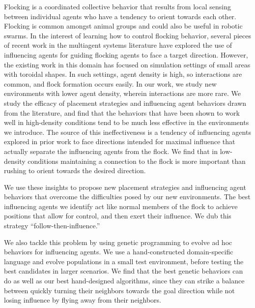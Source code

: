 
Flocking is a coordinated collective behavior that results from local sensing
between individual agents who have a tendency to orient towards each other.
Flocking is common amongst animal groups and could also be useful in robotic
swarms.
In the interest of learning how to control flocking behavior, several pieces
of recent work in the multiagent systems literature have explored the use of
influencing agents for guiding flocking agents to face a target direction.
However, the existing work in this domain has focused on simulation settings
of small areas with toroidal shapes.
In such settings, agent density is high, so interactions are common, and
flock formation occurs easily.
In our work, we study new environments with lower agent density, wherein
interactions are more rare.
We study the efficacy of placement strategies and influencing agent behaviors
drawn from the literature, and find that the behaviors that have been shown to
work well in high-density conditions tend to be much less effective in the
environments we introduce.
The source of this ineffectiveness is a tendency of influencing agents explored
in prior work to face directions intended for maximal influence that actually
separate the influencing agents from the flock.
We find that in low-density conditions maintaining a connection to the flock is
more important than rushing to orient towards the desired direction.

We use these insights to propose new placement strategies and influencing agent
behaviors that overcome the difficulties posed by our new environments.
The best influencing agents we identify act like normal members of the flock to
achieve positions that allow for control, and then exert their influence.  
We dub this strategy ``follow-then-influence.''

We also tackle this problem by using genetic programming to evolve ad hoc
behaviors for influencing agents.
We use a hand-constructed domain-specific language and evolve populations in
a small test environment, before testing the best candidates in larger
scenarios.
We find that the best genetic behaviors can do as well as our best
hand-designed algorithms, since they can strike a balance between quickly
turning their neighbors towards the goal direction while not losing influence
by flying away from their neighbors.
